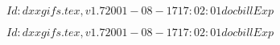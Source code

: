 \documentclass{article}
\begin{document}
$Id: dxxgifs.tex,v 1.7 2001-08-17 17:02:01 docbill Exp $


\pagebreak


$Id: dxxgifs.tex,v 1.7 2001-08-17 17:02:01 docbill Exp $


\pagebreak
\end{document}
